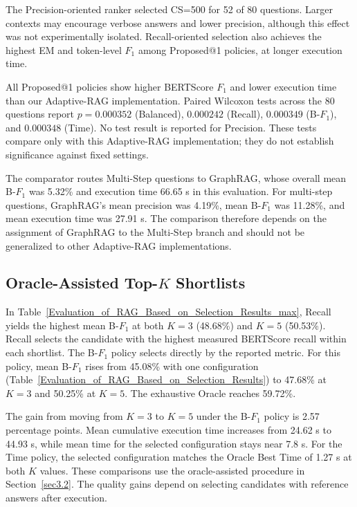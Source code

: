 The Precision-oriented ranker selected CS=500 for 52 of 80 questions. Larger contexts may encourage verbose answers and lower precision, although this effect was not experimentally isolated. Recall-oriented selection also achieves the highest EM and token-level $F_1$ among Proposed@1 policies, at longer execution time.

All Proposed@1 policies show higher BERTScore $F_1$ and lower execution time than our Adaptive-RAG implementation. Paired Wilcoxon tests across the 80 questions report $p=0.000352$ (Balanced), $0.000242$ (Recall), $0.000349$ (B-$F_1$), and $0.000348$ (Time). No test result is reported for Precision. These tests compare only with this Adaptive-RAG implementation; they do not establish significance against fixed settings.

The comparator routes Multi-Step questions to GraphRAG, whose overall mean B-$F_1$ was 5.32\% and execution time 66.65 s in this evaluation. For multi-step questions, GraphRAG's mean precision was 4.19\%, mean B-$F_1$ was 11.28\%, and mean execution time was 27.91 s. The comparison therefore depends on the assignment of GraphRAG to the Multi-Step branch and should not be generalized to other Adaptive-RAG implementations.

\subsection{Oracle-Assisted Top-$K$ Shortlists} \label{sec5.3}
In Table~\ref{Evaluation_of_RAG_Based_on_Selection_Results_max}, Recall yields the highest mean B-$F_1$ at both $K=3$ (48.68\%) and $K=5$ (50.53\%). Recall selects the candidate with the highest measured BERTScore recall within each shortlist. The B-$F_1$ policy selects directly by the reported metric. For this policy, mean B-$F_1$ rises from 45.08\% with one configuration (Table~\ref{Evaluation_of_RAG_Based_on_Selection_Results}) to 47.68\% at $K=3$ and 50.25\% at $K=5$. The exhaustive Oracle reaches 59.72\%.

The gain from moving from $K=3$ to $K=5$ under the B-$F_1$ policy is 2.57 percentage points. Mean cumulative execution time increases from 24.62 s to 44.93 s, while mean time for the selected configuration stays near 7.8 s. For the Time policy, the selected configuration matches the Oracle Best Time of 1.27 s at both $K$ values. These comparisons use the oracle-assisted procedure in Section~\ref{sec3.2}. The quality gains depend on selecting candidates with reference answers after execution.


